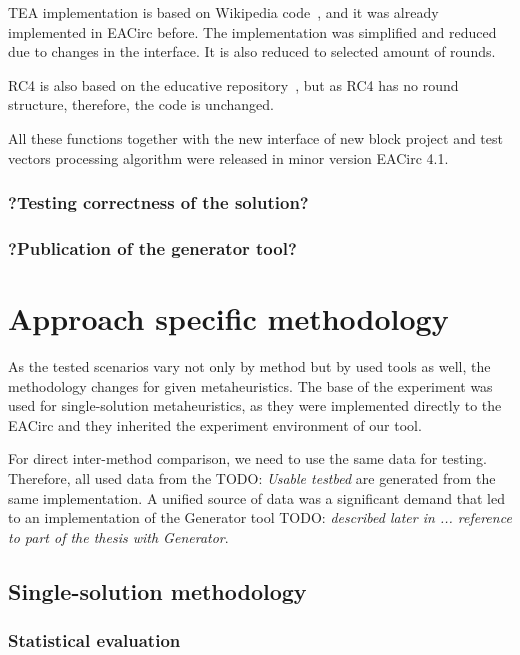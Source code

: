 \documentclass[
  print, %
  Table,   %
  nolof,     %
  nolot,     %
  11pt, %
  oneside  %
]{fithesis3}
\newcommand{\todo}[1]{TODO: \textit{#1}}
\begin{document}
TEA implementation is based on Wikipedia code~\cite{teaWiki}, and it was already implemented in EACirc before. The implementation was simplified and reduced due to changes in the interface. It is also reduced to selected amount of rounds.

RC4 is also based on the educative repository~\cite{cryptoFunc}, but as RC4 has no round structure, therefore, the code is unchanged.

All these functions together with the new interface of new block project and test vectors processing algorithm were released in minor version EACirc 4.1.

\subsubsection{?Testing correctness of the solution?}
\subsubsection{?Publication of the generator tool?}


\section{Approach specific methodology}
\label{sec:method-spec}

As the tested scenarios vary not only by method but by used tools as well, the methodology changes for given metaheuristics. The base of the experiment was used for single-solution metaheuristics, as they were implemented directly to the EACirc and they inherited the experiment environment of our tool.

For direct inter-method comparison, we need to use the same data for testing. Therefore, all used data from the \todo{Usable testbed} are generated from the same implementation. A unified source of data was a significant demand that led to an implementation of the Generator tool \todo{described later in ... reference to part of the thesis with Generator}.

\subsection{Single-solution methodology}
\label{subsec:method-spec-ss}

\subsubsection{Statistical evaluation}
\label{subsubsec:method-spec-ss-stat}
\end{document}
